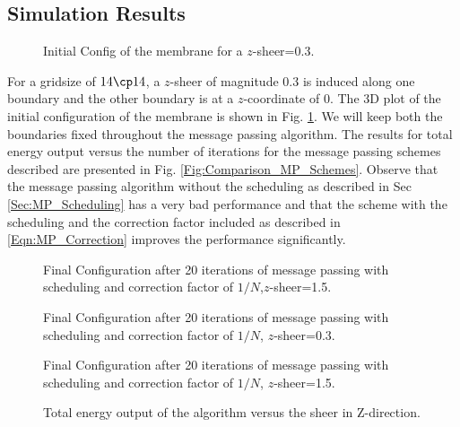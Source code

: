 \documentclass[journal, onecolumn]{IEEEtran}
\begin{document}
\subsection{Simulation Results}
\begin{figure}[h]
\centering
\scalebox{0.75}{}
\caption{Initial Config of the membrane for a $z$-sheer=0.3.}
\label{Fig:Ribbons14Initial}
\end{figure}
For a gridsize of $14 \cp 14$, a $z$-sheer of magnitude $0.3$ is induced along one boundary and the other boundary is at a $z$-coordinate of $0$. The 3D plot of the initial configuration of the membrane is shown in Fig. \ref{Fig:Ribbons14Initial}. We will keep both the boundaries fixed throughout the message passing algorithm. The results for total energy output versus the number of iterations for the message passing schemes described are presented in Fig. \ref{Fig:Comparison_MP_Schemes}. Observe that the message passing algorithm without the scheduling as described in Sec \ref{Sec:MP_Scheduling} has a very bad performance and that the scheme with the scheduling and the correction factor included as described in \eqref{Eqn:MP_Correction} improves the performance significantly.


\begin{figure}[h]
\centering

\caption{Final Configuration after 20 iterations of message passing with scheduling and correction factor of $1/N$,$z$-sheer=1.5.}
\label{Fig:Ribbons14Initial_z=1.5}
\end{figure}

\begin{figure}[h]
\centering
\scalebox{0.45}{}
\caption{Final Configuration after 20 iterations of message passing with scheduling and correction factor of $1/N$, $z$-sheer=0.3.}
\label{Fig:Ribbons14Final_z=1.5}
\end{figure}

\begin{figure}[h]
\centering
\scalebox{0.5}{}
\caption{Final Configuration after 20 iterations of message passing with scheduling and correction factor of $1/N$, $z$-sheer=1.5.}
\label{Fig:Ribbons14Final_z=1.5}
\end{figure}


\begin{figure}
\centering
\scalebox{0.75}{}
\caption{Total energy output of the algorithm versus the sheer in Z-direction.}
\label{Fig:Effect_Increasing_Force}
\end{figure}



\end{document}
